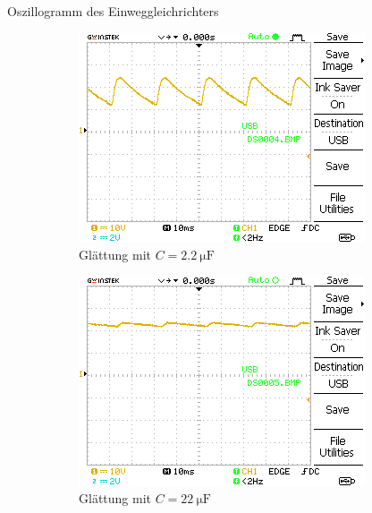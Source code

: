 \documentclass{article}
\theoremstyle{definition}
\begin{document}
\begin{aufgabe}{Oszillogramm des Einweggleichrichters}
\begin{figure}[H]
\begin{subfigure}[b]{0.49 \textwidth}
            \includegraphics[width=\textwidth]{MesswerteVersuch2/DS0004.png}
            \caption{Glättung mit $C = \SI{2.2}{\micro\farad}$}
            \label{a3_b}
        \end{subfigure}
        \vspace{1em}
        \begin{subfigure}[b]{0.49 \textwidth}
            \includegraphics[width=\textwidth]{MesswerteVersuch2/DS0005.png}
            \caption{Glättung mit $C = \SI{22}{\micro\farad}$}
            \label{a3_c}
        \end{subfigure}
        \hfill
        \begin{subfigure}[b]{0.49 \textwidth}

\end{subfigure}
\end{figure}
\end{aufgabe}
\end{document}
